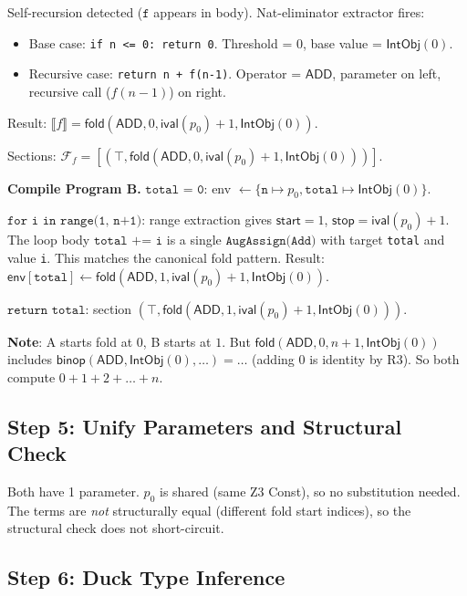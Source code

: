 \documentclass[11pt,a4paper]{report}
\theoremstyle{definition}
\theoremstyle{plain}
\newcommand{\den}[1]{\llbracket #1 \rrbracket}
\newcommand{\fold}{\mathsf{fold}}
\newcommand{\presheaf}{\mathcal{F}}
\begin{document}
Self-recursion detected ($\texttt{f}$ appears in body).
Nat-eliminator extractor fires:
\begin{itemize}
  \item Base case: \texttt{if n <= 0: return 0}.
    Threshold = $0$, base value = $\mathsf{IntObj}(0)$.
  \item Recursive case: \texttt{return n + f(n-1)}.
    Operator = $\mathsf{ADD}$, parameter on left, recursive call
    ($f(n-1)$) on right.
\end{itemize}
Result: $\den{f} = \fold(\mathsf{ADD}, 0, \mathsf{ival}(p_0) + 1,
\mathsf{IntObj}(0))$.

Sections: $\presheaf_f = [(\top, \fold(\mathsf{ADD}, 0,
\mathsf{ival}(p_0)+1, \mathsf{IntObj}(0)))]$.

\textbf{Compile Program B.}
$\texttt{total = 0}$: env $\leftarrow \{\texttt{n} \mapsto p_0,
\texttt{total} \mapsto \mathsf{IntObj}(0)\}$.

$\texttt{for i in range(1, n+1)}$: range extraction gives
$\mathsf{start} = 1$, $\mathsf{stop} = \mathsf{ival}(p_0) + 1$.
The loop body $\texttt{total += i}$ is a single
$\texttt{AugAssign(Add)}$ with target \texttt{total} and value
\texttt{i}.  This matches the canonical fold pattern.
Result: $\mathsf{env}[\texttt{total}] \leftarrow
\fold(\mathsf{ADD}, 1, \mathsf{ival}(p_0)+1, \mathsf{IntObj}(0))$.

$\texttt{return total}$: section $(\top, \fold(\mathsf{ADD}, 1,
\mathsf{ival}(p_0)+1, \mathsf{IntObj}(0)))$.

\textbf{Note}: A starts fold at $0$, B starts at $1$.  But
$\fold(\mathsf{ADD}, 0, n+1, \mathsf{IntObj}(0))$ includes
$\mathsf{binop}(\mathsf{ADD}, \mathsf{IntObj}(0), \ldots) =
\ldots$ (adding 0 is identity by R3).  So both compute
$0 + 1 + 2 + \ldots + n$.

\subsection{Step 5: Unify Parameters and Structural Check}

Both have 1 parameter.  $p_0$ is shared (same Z3 Const), so no
substitution needed.  The terms are \emph{not} structurally equal
(different fold start indices), so the structural check does not
short-circuit.

\subsection{Step 6: Duck Type Inference}
\end{document}
